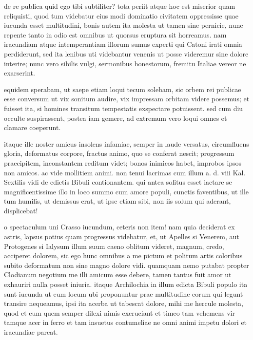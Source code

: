 


 de re publica quid ego tibi subtiliter? tota periit atque hoc est miserior quam reliquisti, quod tum videbatur eius modi dominatio civitatem oppressisse quae iucunda esset multitudini, bonis autem ita molesta ut tamen sine pernicie, nunc repente tanto in odio est omnibus ut quorsus eruptura sit horreamus. nam iracundiam atque intemperantiam illorum sumus experti qui Catoni irati omnia perdiderunt, sed ita lenibus uti videbantur venenis ut posse videremur sine dolore interire; nunc vero sibilis vulgi, sermonibus honestorum, fremitu Italiae vereor ne exarserint.

 equidem sperabam, ut saepe etiam loqui tecum solebam, sic orbem rei publicae esse conversum ut vix sonitum audire, vix impressam orbitam videre possemus; et fuisset ita, si homines transitum tempestatis exspectare potuissent. sed cum diu occulte suspirassent, postea iam gemere, ad extremum vero loqui omnes et clamare coeperunt.

 itaque ille noster amicus insolens infamiae, semper in laude versatus, circumfluens gloria, deformatus corpore, fractus animo, quo se conferat nescit; progressum praecipitem, inconstantem reditum videt; bonos inimicos habet, improbos ipsos non amicos. ac vide mollitiem animi. non tenui lacrimas cum illum a. d. viii Kal. Sextilis vidi de edictis Bibuli contionantem. qui antea solitus esset iactare se magnificentissime illo in loco summo cum amore populi, cunctis faventibus, ut ille tum humilis, ut demissus erat, ut ipse etiam sibi, non iis solum qui aderant, displicebat!

 o spectaculum uni Crasso iucundum, ceteris non item! nam quia deciderat ex astris, lapsus potius quam progressus videbatur, et, ut Apelles si Venerem, aut Protogenes si Ialysum illum suum caeno oblitum videret, magnum, credo, acciperet dolorem, sic ego hunc omnibus a me pictum et politum artis coloribus subito deformatum non sine magno dolore vidi. quamquam nemo putabat propter Clodianum negotium me illi amicum esse debere, tamen tantus fuit amor ut exhauriri nulla posset iniuria. itaque Archilochia in illum edicta Bibuli populo ita sunt iucunda ut eum locum ubi proponuntur prae multitudine eorum qui legunt transire nequeamus, ipsi ita acerba ut tabescat dolore, mihi me hercule molesta, quod et eum quem semper dilexi nimis excruciant et timeo tam vehemens vir tamque acer in ferro et tam insuetus contumeliae ne omni animi impetu dolori et iracundiae pareat.


